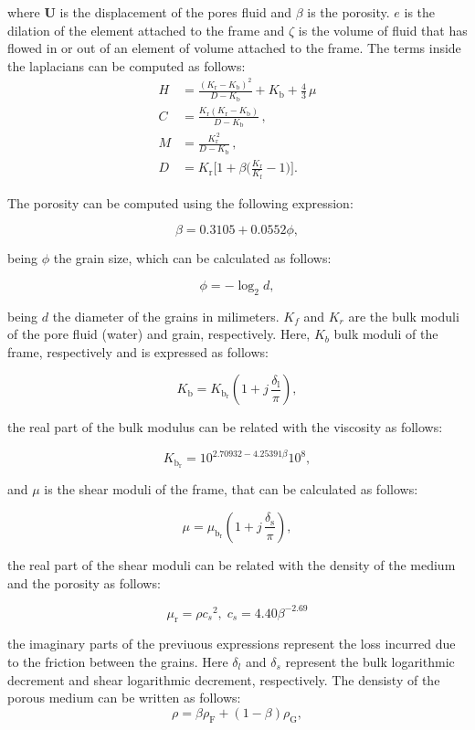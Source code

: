 \documentclass{article}[a4paper, 12pt]
\begin{document}
 where $\bm{U}$ is the displacement of the pores fluid and $\beta$ is the porosity. $e$ is the dilation of the element attached to the frame and $\zeta$ is the volume of fluid that has flowed in or out of an element of volume attached to the frame. The terms inside the laplacians can be computed as follows:
$$
\begin{aligned} {H} & {{}=\frac{( K_{\mathrm{r}}-K_{\mathrm{b}} )^{2}} {D-K_{\mathrm{b}}}+K_{\mathrm{b}}+\frac{4} {3} \, \mu} \\[1.5ex]
{C} & {{}=\frac{K_{\mathrm{r}} ( K_{\mathrm{r}}-K_{\mathrm{b}} )} {D-K_{\mathrm{b}}} \,,} \\[1.5ex]
{M} & {{}=\frac{K_{\mathrm{r}}^{\, 2}} {D-K_{\mathrm{b}}} \,,} \\[1.5ex] 
D&=K_{\mathrm{r}} \bigg[ 1+\beta\bigg( \frac{K_{\mathrm{r}}} {K_{\mathrm{f}}}-1 \bigg) \bigg].
\end{aligned}
$$

The porosity can be computed using the following expression:

$$ \beta = 0.3105 + 0.0552\phi, $$

being $\phi$ the grain size, which can be calculated as follows:

$$ \phi=-\operatorname{l o g}_{2}d,$$

being $d$ the diameter of the grains in milimeters. $K_f$ and $K_r$ are the bulk moduli of the pore fluid (water) and grain, respectively. Here, $K_b$  bulk moduli of the frame, respectively and is expressed as follows:

$$ K_{\mathrm{b}}=K_{\mathrm{b_r}} \! \left( 1+j \, \frac{\delta_{\mathrm{l}}} {\pi} \right),
$$

the real part of the bulk modulus can be related with the viscosity as follows:


$$ K_\mathrm{b_r} = 10^{2.70932-4.25391\beta} 10^8,$$

and $\mu$ is the shear moduli of the frame, that can be calculated as follows:

$$ \mu=\mu_{\mathrm{b_r}} \! \left( 1+j \, \frac{\delta_{\mathrm{s}}} {\pi} \right),
$$

the real part of the shear moduli can be related with the density of the medium and the porosity as follows:

$$ \mu_{\mathrm{r}}=\rho{c_{s}}^{2}, \; c_{s}=4. 4 0 \beta^{-2.69}
$$

the imaginary parts of the previuous expressions represent the loss incurred due to the friction between the grains. Here $\delta_l$ and $\delta_s$ represent the bulk logarithmic decrement and shear logarithmic decrement, respectively. The densisty of the porous medium can be written as follows: 
$$ \rho=\beta\rho_{\mathrm{F}}+( 1-\beta) \rho_{\mathrm{G}},$$
\end{document}
